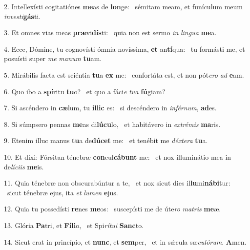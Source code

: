 2. Intellexísti cogitatiónes \textbf{me}as de \textbf{lon}ge: \ast\  sémitam meam, et funículum meum \textit{in}\textit{ves}\textit{ti}\textbf{gás}ti.\

3. Et omnes vias meas \textbf{præ}vi\textbf{dís}ti: \ast\  quia non est sermo \textit{in} \textit{lin}\textit{gua} \textbf{me}a.\

4. Ecce, Dómine, tu cognovísti ómnia novíssima, \textbf{et} an\textbf{tí}qua: \ast\  tu formásti me, et posuísti super \textit{me} \textit{ma}\textit{num} \textbf{tu}am.\

5. Mirábilis facta est sciéntia \textbf{tu}a \textbf{ex} me: \ast\  confortáta est, et non pót\textit{e}\textit{ro} \textit{ad} \textbf{e}am.\

6. Quo ibo a \textbf{spí}ritu \textbf{tu}o? \ast\  et quo a fáci\textit{e} \textit{tu}\textit{a} \textbf{fú}giam?\

7. Si ascéndero in \textbf{cæ}lum, tu \textbf{il}\textbf{lic} es: \ast\  si descéndero in \textit{in}\textit{fér}\textit{num}, \textbf{ad}es.\

8. Si súmpsero pennas \textbf{me}as di\textbf{lú}\textbf{cu}lo, \ast\  et habitávero in \textit{ex}\textit{tré}\textit{mis} \textbf{ma}ris.\

9. Etenim illuc manus \textbf{tu}a de\textbf{dú}\textbf{cet} me: \ast\  et tenébit me \textit{déx}\textit{te}\textit{ra} \textbf{tu}a.\

10. Et dixi: Fórsitan ténebræ \textbf{con}cul\textbf{cá}\textbf{bunt} me: \ast\  et nox illuminátio mea in de\textit{lí}\textit{ci}\textit{is} \textbf{me}is.\

11. Quia ténebræ non obscurabúntur a te, \dag\  et nox sicut dies il\textbf{lu}mi\textbf{ná}\textbf{bi}tur: \ast\  sicut ténebræ ejus, ita \textit{et} \textit{lu}\textit{men} \textbf{e}jus.\

12. Quia tu possedísti \textbf{re}nes \textbf{me}os: \ast\  suscepísti me de úte\textit{ro} \textit{ma}\textit{tris} \textbf{me}æ.\

13. Glória \textbf{Pa}tri, et \textbf{Fí}\textbf{li}o, \ast\  et Spi\textit{rí}\textit{tu}\textit{i} \textbf{Sanc}to.\

14. Sicut erat in princípio, et \textbf{nunc}, et \textbf{sem}per, \ast\  et in sǽcula sæ\textit{cu}\textit{ló}\textit{rum}. \textbf{A}men.\

